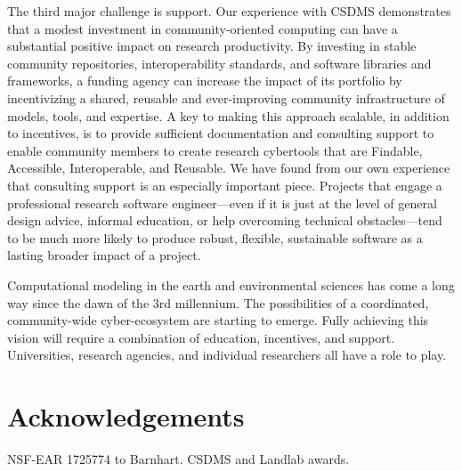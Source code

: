 \documentclass[12pt]{amsart}
\begin{document}
The third major challenge is support. Our experience with CSDMS demonstrates that a modest investment in community-oriented computing can have a substantial positive impact on research productivity. By investing in stable community repositories, interoperability standards, and software libraries and frameworks, a funding agency can increase the impact of its portfolio by incentivizing a shared, reusable and ever-improving community infrastructure of models, tools, and expertise. A key to making this approach scalable, in addition to incentives, is to provide sufficient documentation and consulting support to enable community members to create research cybertools that are Findable, Accessible, Interoperable, and Reusable. We have found from our own experience that consulting support is an especially important piece. Projects that engage a professional research software engineer---even if it is just at the level of general design advice, informal education, or help overcoming technical obstacles---tend to be much more likely to produce robust, flexible, sustainable software as a lasting broader impact of a project.

Computational modeling in the earth and environmental sciences has come a long way since the dawn of the 3rd millennium. The possibilities of a coordinated, community-wide cyber-ecosystem are starting to emerge. Fully achieving this vision will require a combination of education, incentives, and support. Universities, research agencies, and individual researchers all have a role to play.


\section{Acknowledgements}

NSF-EAR 1725774 to Barnhart. CSDMS and Landlab awards.





















 
\end{document}
